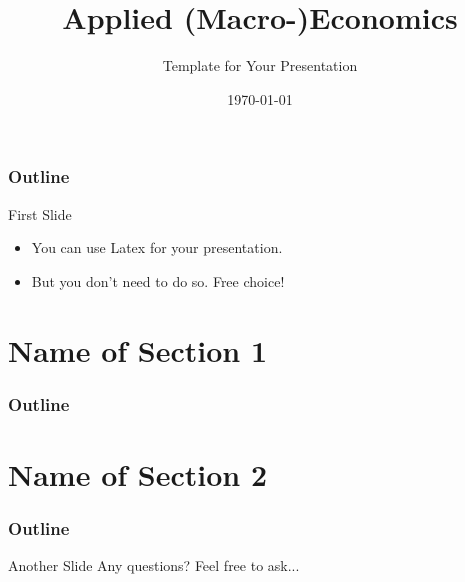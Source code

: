 \documentclass[handout]{beamer}
\newcommand{\docOne}{Template for Your Presentation}
\begin{document}
\title[Applied (Macro-)Economics]{Applied (Macro-)Economics}
\author[Ilka Gerhardts]{\small \docOne}
\date[Winter Term]{\small \today}
\maketitle

\begin{frame}
\frametitle{Outline}
\tableofcontents
\end{frame}

\begin{frame}{First Slide}\label{s1}
   \begin{itemize}
        \pause
        \item You can use Latex for your presentation.
        \vspace{0.2cm}
        \pause
        \item But you don't need to do so. Free choice!
    \end{itemize}
\end{frame}

\section{Name of Section 1}
\begin{frame}
\frametitle{Outline}
\tableofcontents[currentsection]
\end{frame}


\section{Name of Section 2}
\begin{frame}
\frametitle{Outline}
\tableofcontents[currentsection]
\end{frame}

\begin{frame}{Another Slide}
    Any questions? Feel free to ask...
\end{frame}   
\end{document}
